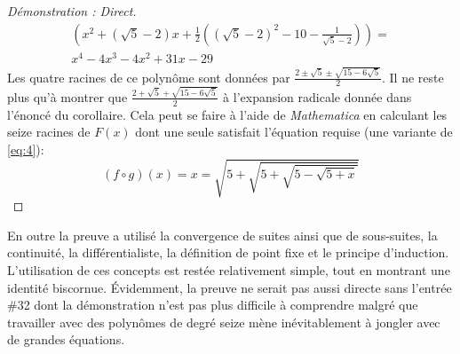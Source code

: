 \begin{proof}[Démonstration : Direct]
\begin{align*}
		\left(x^2+\left(\sqrt{5}-2\right) x+\frac{1}{2} \left(\left(\sqrt{5}-2\right)^2-10-\frac{1}{\sqrt{5}-2}\right)\right)=\\
		x^4-4 x^3-4 x^2+31 x-29
	\end{align*}
	Les quatre racines de ce polynôme sont données par 
	\(\frac{2\pm\sqrt{5}\pm\sqrt{15-6\sqrt{5}}}{2}\). Il ne reste plus qu'à montrer que \(\frac{2+{\sqrt {5}}+{\sqrt {15-6{\sqrt {5}}}}}{2}\) à l'expansion radicale donnée dans l'énoncé du corollaire. Cela peut se faire à l'aide de \textit{Mathematica} en calculant les seize racines de \(F(x)\) dont une seule satisfait l'équation requise (une variante de \ref{eq:4}):
	\[(f\circ g)(x)=x=\sqrt{5+\sqrt{5+\sqrt{5-\sqrt{5+x}}}}\]
\end{proof}
En outre la preuve a utilisé la convergence de suites ainsi que de sous-suites, la continuité, la différentialiste, la définition de point fixe et le principe d'induction. L'utilisation de ces concepts est restée relativement simple, tout en montrant une identité biscornue. Évidemment, la preuve ne serait pas aussi directe sans l'entrée \#32 dont la démonstration n'est pas plus difficile à comprendre malgré que travailler avec des polynômes de degré seize mène inévitablement à jongler avec de grandes équations.